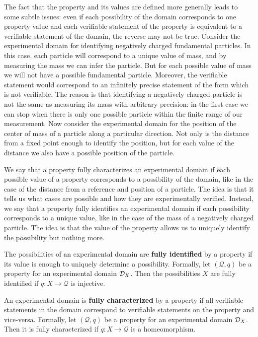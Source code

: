 The fact that the property and its values are defined more generally leads to some subtle issues: even if each possibility of the domain corresponds to one property value and each verifiable statement of the property is equivalent to a verifiable statement of the domain, the reverse may not be true. Consider the experimental domain for identifying negatively charged fundamental particles. In this case, each particle will correspond to a unique value of mass, and by measuring the mass we can infer the particle. But for each possible value of mass we will not have a possible fundamental particle. Moreover, the verifiable statement  would correspond to an infinitely precise statement of the form  which is not verifiable. The reason is that identifying a negatively charged particle is not the same as measuring its mass with arbitrary precision: in the first case we can stop when there is only one possible particle within the finite range of our measurement. Now consider the experimental domain for the position of the center of mass of a particle along a particular direction. Not only is the distance from a fixed point enough to identify the position, but for each value of the distance we also have a possible position of the particle.

We say that a property fully characterizes an experimental domain if each possible value of a property corresponds to a possibility of the domain, like in the case of the distance from a reference and position of a particle. The idea is that it tells us what cases are possible and how they are experimentally verified. Instead, we say that a property fully identifies an experimental domain if each possibility corresponds to a unique value, like in the case of the mass of a negatively charged particle. The idea is that the value of the property allows us to uniquely identify the possibility but nothing more.

\begin{mathSection}
	\begin{defn}
		The possibilities of an experimental domain are \textbf{fully identified} by a property if its value is enough to uniquely determine a possibility. Formally, let $(\mathcal{Q}, q)$ be a property for an experimental domain $\mathcal{D}_X$. Then the possibilities $X$ are fully identified if $q: X \to \mathcal{Q}$ is injective.
	\end{defn}
	
	\begin{defn}
		An experimental domain is \textbf{fully characterized} by a property if all verifiable statements in the domain correspond to verifiable statements on the property and vice-versa. Formally, let $(\mathcal{Q}, q)$ be a property for an experimental domain $\mathcal{D}_X$. Then it is fully characterized if $q: X \to \mathcal{Q}$ is a homeomorphism.
	\end{defn}
\end{mathSection}

